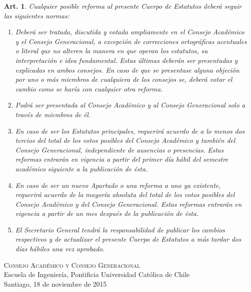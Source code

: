 \documentclass[letterpaper,11pt]{article}
\theoremstyle{plain}
\newtheorem{art}{Art.} %
\begin{document}
		\begin{art}\label{normaReforma}
			Cualquier posible reforma al presente Cuerpo de Estatutos deberá seguir las siguientes normas:
			\begin{enumerate}
				\item Deberá ser tratada, discutida y votada ampliamente en el Consejo Académico y el Consejo Generacional, a excepción de correcciones ortográficas acentuales o literal que no alteren la manera en que operan los estatutos, su interpretación e idea fundamental. Estas últimas deberán ser presentadas y explicadas en ambos consejos. En caso de que se presentase alguna objeción por uno o más miembros de cualquiera de los consejos se, deberá votar el cambio como se haría con cualquier otra reforma.

				\item  Podrá ser presentada al Consejo Académico y al Consejo Generacional solo a través de miembros de él.

				\item  En caso de ser los Estatutos principales, requerirá acuerdo de a lo menos dos tercios del total de los votos posibles del Consejo Académico y también del Consejo Generacional, independiente de ausencias o presencias. Estas reformas entrarán en vigencia a partir del primer día hábil del semestre académico siguiente a la publicación de ésta.

				\item  En caso de ser un nuevo Apartado o una reforma a uno ya existente, requerirá acuerdo de la mayoría absoluta del total de los votos posibles del Consejo Académico y del Consejo Generacional. Estas reformas entrarán en vigencia a partir de un mes después de la publicación de ésta.
				\item  El Secretario General tendrá la responsabilidad de publicar los cambios respectivos y de actualizar el presente Cuerpo de Estatutos a más tardar dos días hábiles una vez aprobado.
			\end{enumerate}
		\end{art}

	\vfill
	\textsc{Consejo Académico y Consejo Generacional}\\
	Escuela de Ingeniería, Pontificia Universidad Católica de Chile\\
	Santiago, 18 de noviembre de 2015

	\newpage
\end{document}
